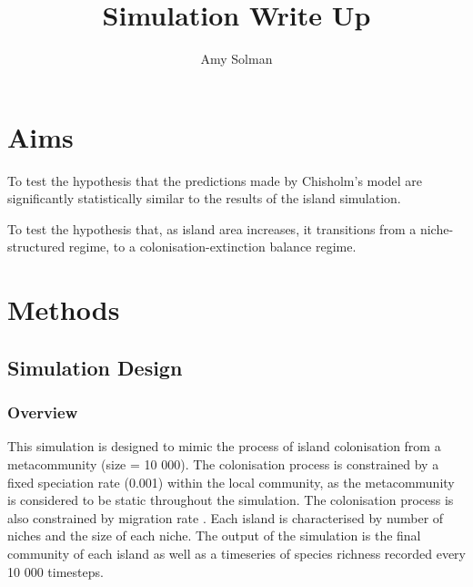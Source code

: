 \documentclass{article}
\begin{document}
\title{Simulation Write Up{}}
\author{Amy Solman}

\maketitle

\section{Aims}
To test the hypothesis that the predictions made by Chisholm’s model are significantly statistically similar to the results of the island simulation. \bigskip

\noindent To test the hypothesis that, as island area increases, it transitions from a niche-structured regime, to a colonisation-extinction balance regime. 

\section{Methods}

\subsection{Simulation Design}

\subsubsection{Overview}
This simulation is designed to mimic the process of island colonisation from a metacommunity (size = 10 000). The colonisation process is constrained by a fixed speciation rate (0.001) within the local community, as the metacommunity is considered to be static throughout the simulation. The colonisation process is also constrained by migration rate . Each island is characterised by number of niches and the size of each niche. The output of the simulation is the final community of each island as well as a timeseries of species richness recorded every 10 000 timesteps. 
\end{document}
